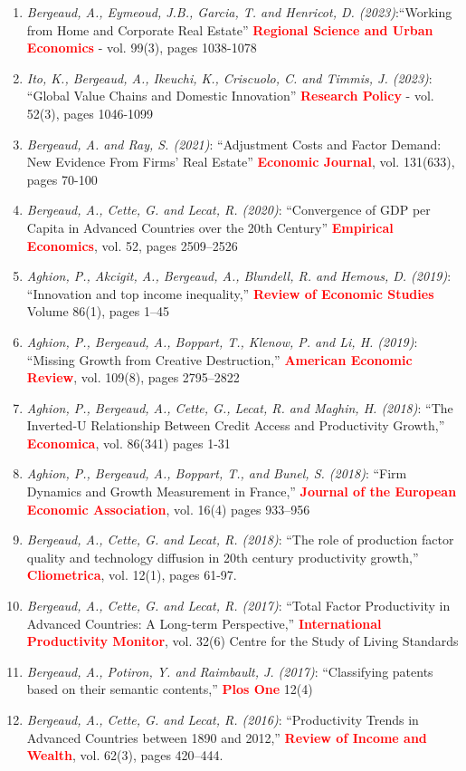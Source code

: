 \documentclass[12pt]{article}
\begin{document}
\begin{footnotesize}
\begin{enumerate}
    \item \emph{Bergeaud, A., Eymeoud, J.B., Garcia, T. and Henricot, D. (2023)}:``Working from Home and Corporate Real Estate'' \textbf{\textcolor{red}{Regional Science and Urban Economics}} - vol. 99(3), pages 1038-1078
    \item \emph{Ito, K., Bergeaud, A., Ikeuchi, K., Criscuolo, C. and Timmis, J. (2023)}: ``Global Value Chains and Domestic Innovation'' \textbf{\textcolor{red}{Research Policy}} - vol. 52(3), pages 1046-1099
    \item \emph{Bergeaud, A. and Ray, S. (2021)}: ``Adjustment Costs and Factor Demand: New Evidence From Firms’ Real Estate'' \textbf{\textcolor{red}{Economic Journal}}, vol. 131(633), pages 70-100
    \item \emph{Bergeaud, A., Cette, G. and Lecat, R. (2020)}: ``Convergence of GDP per Capita in Advanced Countries over the 20th Century'' \textbf{\textcolor{red}{Empirical Economics}}, vol. 52, pages 2509–2526
    \item \emph{Aghion, P., Akcigit, A., Bergeaud, A., Blundell, R. and Hemous, D. (2019)}: ``Innovation and top income inequality,'' \textbf{\textcolor{red}{Review of Economic Studies}} Volume 86(1), pages 1–45
    \item \emph{Aghion, P., Bergeaud, A., Boppart, T., Klenow, P. and Li, H. (2019)}: ``Missing Growth from Creative Destruction,'' \textbf{\textcolor{red}{American Economic Review}}, vol. 109(8), pages 2795–2822
    \item \emph{Aghion, P., Bergeaud, A., Cette, G., Lecat, R. and Maghin, H. (2018)}: ``The Inverted-U Relationship Between Credit Access and Productivity Growth,'' \textbf{\textcolor{red}{Economica}}, vol. 86(341) pages 1-31
    \item \emph{Aghion, P., Bergeaud, A., Boppart, T., and Bunel, S. (2018)}: ``Firm Dynamics and Growth Measurement in France,'' \textbf{\textcolor{red}{Journal of the European Economic Association}}, vol. 16(4) pages 933–956
    \item \emph{Bergeaud, A., Cette, G. and Lecat, R. (2018)}: ``The role of production factor quality and technology diffusion in 20th century productivity growth,'' \textbf{\textcolor{red}{Cliometrica}}, vol. 12(1), pages 61-97. 
    \item \emph{Bergeaud, A., Cette, G. and Lecat, R. (2017)}: ``Total Factor Productivity in Advanced Countries: A Long-term Perspective,'' \textbf{\textcolor{red}{International Productivity Monitor}}, vol. 32(6) Centre for the Study of Living Standards
    \item \emph{Bergeaud, A., Potiron, Y. and Raimbault, J. (2017)}: ``Classifying patents based on their semantic contents,'' \textbf{\textcolor{red}{Plos One}} 12(4) 
    \item  \emph{Bergeaud, A., Cette, G. and Lecat, R. (2016)}: ``Productivity Trends in Advanced Countries between 1890 and 2012,'' \textbf{\textcolor{red}{Review of Income and Wealth}}, vol. 62(3), pages 420–444.  
\end{enumerate}
\end{footnotesize}
\end{document}

